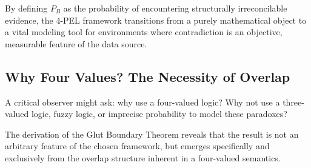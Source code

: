 \documentclass[11pt,a4paper]{article}
\begin{document}
By defining $P_B$ as the probability of encountering structurally irreconcilable evidence, the 4-PEL framework transitions from a purely mathematical object to a vital modeling tool for environments where contradiction is an objective, measurable feature of the data source.

\subsection{Why Four Values? The Necessity of Overlap}

A critical observer might ask: why use a four-valued logic? Why not use a three-valued logic, fuzzy logic, or imprecise probability to model these paradoxes?

The derivation of the Glut Boundary Theorem reveals that the result is not an arbitrary feature of the chosen framework, but emerges specifically and exclusively from the overlap structure inherent in a four-valued semantics.
\end{document}
